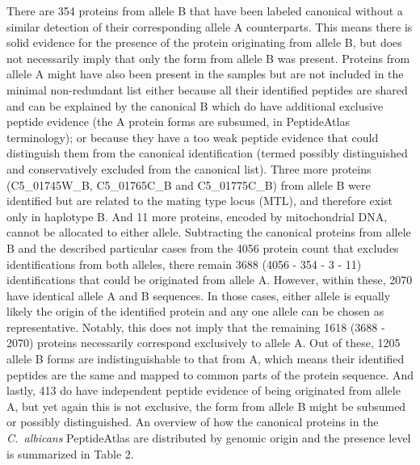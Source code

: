 There are 354 proteins from allele B that have been labeled canonical without a similar
detection of their corresponding allele A counterparts. This means there is solid evidence for
the presence of the protein originating from allele B, but does not necessarily imply that only
the form from allele B was present. Proteins from allele A might have also been present in
the samples but are not included in the minimal non-redundant list either because all their
identified peptides are shared and can be explained by the canonical B which do have
additional exclusive peptide evidence (the A protein forms are subsumed, in PeptideAtlas
terminology); or because they have a too weak peptide evidence that could distinguish them
from the canonical identification (termed possibly distinguished and conservatively excluded
from the canonical list).
Three more proteins (C5\_01745W\_B, C5\_01765C\_B and C5\_01775C\_B) from allele B were
identified but are related to the mating type locus (MTL), and therefore exist only in haplotype
B. And 11 more proteins, encoded by mitochondrial DNA, cannot be allocated to either allele.
Subtracting the canonical proteins from allele B and the described particular cases from the
4056 protein count that excludes identifications from both alleles, there remain 3688 (4056 -
354 - 3 - 11) identifications that could be originated from allele A. However, within these,
2070 have identical allele A and B sequences. In those cases, either allele is equally likely
the origin of the identified protein and any one allele can be chosen as representative.
Notably, this does not imply that the remaining 1618 (3688 - 2070) proteins necessarily
correspond exclusively to allele A. Out of these, 1205 allele B forms are indistinguishable to
that from A, which means their identified peptides are the same and mapped to common
parts of the protein sequence. And lastly, 413 do have independent peptide evidence of being
originated from allele A, but yet again this is not exclusive, the form from allele B might be
subsumed or possibly distinguished. An overview of how the canonical proteins in the
\textit{\mbox{C. albicans}} PeptideAtlas are distributed by genomic origin and the presence level is
summarized in Table 2.

